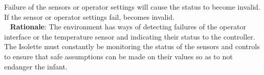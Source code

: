 {Failure of the sensors or operator settings will cause the status to become invalid.\\}
{If the sensor or operator settings fail,  becomes invalid.\\~}
\label{E3}
\noindent \textbf{Rationale}: The environment has ways of detecting failures of the operator interface or the temperature sensor and indicating their status to the controller. The Isolette must constantly be monitoring the status of the sensors and controls to ensure that safe assumptions can be made on their values so as to not endanger the infant.
